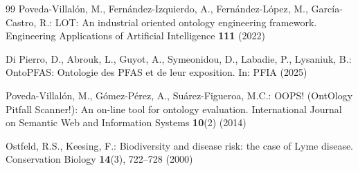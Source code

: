 \begin{thebibliography}{99}
Poveda-Villal\'on, M., Fern\'andez-Izquierdo, A., Fern\'andez-L\'opez, M.,
Garc\'ia-Castro, R.: LOT: An industrial oriented ontology engineering
framework. Engineering Applications of Artificial Intelligence \textbf{111}
(2022)

Di Pierro, D., Abrouk, L., Guyot, A., Symeonidou, D., Labadie, P.,
Lysaniuk, B.: OntoPFAS: Ontologie des PFAS et de leur exposition. In: PFIA
(2025)

Poveda-Villal\'on, M., G\'omez-P\'erez, A., Su\'arez-Figueroa, M.C.:
OOPS! (OntOlogy Pitfall Scanner!): An on-line tool for ontology evaluation.
International Journal on Semantic Web and Information Systems \textbf{10}(2)
(2014)

Ostfeld, R.S., Keesing, F.: Biodiversity and disease risk: the case of Lyme
disease. Conservation Biology \textbf{14}(3), 722--728 (2000)

\end{thebibliography}


